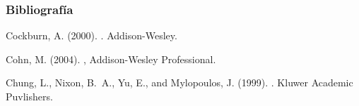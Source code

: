 \documentclass[handout,a4paper,slidestop,xcolor=pst,dvips,blue]{beamer}
\begin{document}
\begin{frame}[c]
	\frametitle{Bibliografía}
\begin{thebibliography}{}

Cockburn, A. (2000).
.
\newblock Addison-Wesley.

Cohn, M. (2004).
,
\newblock Addison-Wesley Professional.

Chung, L., Nixon, B.~A., Yu, E., and Mylopoulos, J. (1999).
.
\newblock Kluwer Academic Puvlishers.

\end{thebibliography}

\end{frame}
\end{document}
